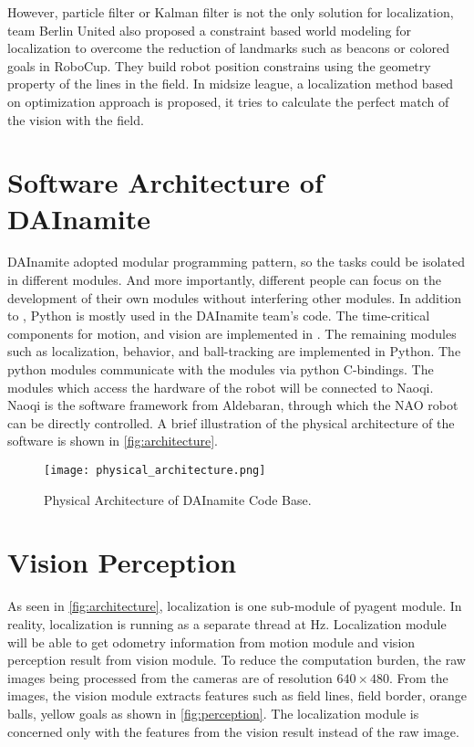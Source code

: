 However, particle filter or Kalman filter is not the only solution for localization, team Berlin United also proposed a constraint based world modeling for localization \cite{Gohring2009} to overcome the reduction of landmarks such as beacons or colored goals in RoboCup. They build robot position constrains using the geometry property of the lines in the field. In midsize league, a localization method based on optimization approach \cite{Lauer2006} is proposed, it tries to calculate the perfect match of the vision with the field.



\section{Software Architecture of DAInamite}\label{sec:arch}
DAInamite adopted modular programming pattern, so the tasks could be isolated in different modules. And more importantly, different people can focus on the development of their own modules without interfering other modules. In addition to \cpp{}, Python is mostly used in the DAInamite team's code.
The time-critical components for motion, and vision are implemented in \cpp{}. The remaining modules such as localization, behavior, and ball-tracking are implemented in Python. The python modules communicate with the \cpp{} modules via python C-bindings. The modules which access the hardware of the robot will be connected to Naoqi. Naoqi is the software framework from Aldebaran, through which the NAO robot can be directly controlled. A brief illustration of the physical architecture of the software is shown in \autoref{fig:architecture}. 

\begin{figure}[h!]
  \centering
  \texttt{[image: physical\_architecture.png]}
  \caption{Physical Architecture of DAInamite Code Base.}
  \label{fig:architecture}
\end{figure}

\section{Vision Perception}\label{sec:vision}
As seen in \autoref{fig:architecture}, localization is one sub-module of pyagent module. In reality, localization is running as a separate thread at \unit[30]{Hz}. Localization module will be able to get odometry information from motion module and vision perception result from vision module. To reduce the computation burden, the raw images being processed from the cameras are of resolution $640 \times 480$. From the images, the vision module extracts features such as field lines, field border, orange balls, yellow goals as shown in \autoref{fig:perception}. The localization module is concerned only with the features from the vision result instead of the raw image.

